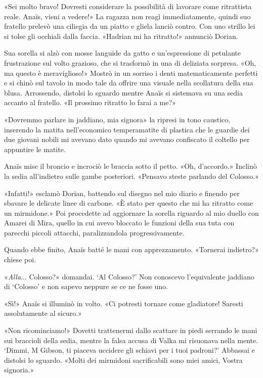 «Sei molto bravo! Dovresti considerare la possibilità di lavorare come
ritrattista reale. Anaïs, vieni a vedere!» La ragazza non reagì
immediatamente, quindi suo fratello prelevò una ciliegia da un piatto e
gliela lanciò contro. Con uno strillo lei si tolse gli occhiali dalla
faccia. «Hadrian mi ha ritratto!» annunciò Dorian.

Sua sorella si alzò con mosse languide da gatto e un'espressione di
petulante frustrazione sul volto grazioso, che si trasformò in una di
deliziata sorpresa. «Oh, ma questo è meraviglioso!» Mostrò in un sorriso
i denti matematicamente perfetti e si chinò sul tavolo in modo tale da
offrire una visuale nella scollatura della sua blusa. Arrossendo,
distolsi lo sguardo mentre Anaïs si sistemava su una sedia accanto al
fratello. «Il prossimo ritratto lo farai a me?»

«Dovremmo parlare in jaddiano, mia signora» la ripresi in tono caustico,
inserendo la matita nell'economico temperamatite di plastica che le
guardie dei due giovani nobili mi avevano dato quando mi avevano
confiscato il coltello per appuntire le matite.

Anaïs mise il broncio e incrociò le braccia sotto il petto. «Oh,
d'accordo.» Inclinò la sedia all'indietro sulle gambe posteriori.
«Pensavo steste parlando del Colosso.»

«Infatti!» esclamò Dorian, battendo sul disegno nel mio diario e finendo
per sbavare le delicate linee di carbone. «È stato per questo che mi ha
ritratto come un mirmidone.» Poi procedette ad aggiornare la sorella
riguardo al mio duello con Amarei di Mira, quello in cui avevo bloccato
le funzioni della sua tuta con parecchi piccoli attacchi, paralizzandola
progressivamente.

Quando ebbe finito, Anaïs batté le mani con apprezzamento. «Tornerai
indietro?» chiese poi.

«\emph{Alla}... Colosso?» domandai. `Al Colosso?' Non conoscevo
l'equivalente jaddiano di `Colosso' e non sapevo neppure se ce ne fosse
uno.

«Sì!» Anaïs si illuminò in volto. «Ci potresti tornare come gladiatore!
Saresti assolutamente al sicuro.»

«Non ricominciamo!» Dovetti trattenermi dallo scattare in piedi serrando
le mani sui braccioli della sedia, mentre la falsa accusa di Valka mi
risuonava nella mente. `Dimmi, M Gibson, ti piaceva uccidere gli schiavi
per i tuoi padroni?' Abbassai e distolsi lo sguardo. «Molti dei
mirmidoni sacrificabili sono miei amici, Vostra signoria.»

